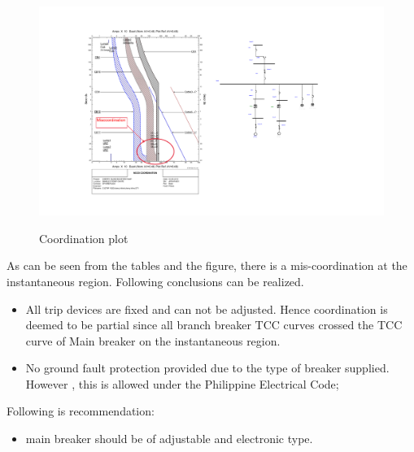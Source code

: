 \begin{figure}[!htb]
	\includegraphics[width=\textwidth]{figures/fig_ch04_elecaudit_protection_coordination01.pdf} \\
	\caption{Coordination plot}
	\label{fig_ch04_elecaudit_protection_coordination01} 
\end{figure}

As can be seen from the tables and the figure, there is a mis-coordination at the instantaneous region. Following conclusions can be realized.

\begin{itemize}
\item All trip devices are fixed and can not be adjusted. Hence coordination is deemed to be partial since all branch breaker TCC curves crossed the TCC curve of Main breaker on the instantaneous region. 

\item No ground fault protection provided due to the type of breaker supplied. However , this is allowed under the Philippine Electrical Code;

\end{itemize}

Following is recommendation:

\begin{itemize}
	\item main breaker should be of adjustable and electronic type.
\end{itemize}


